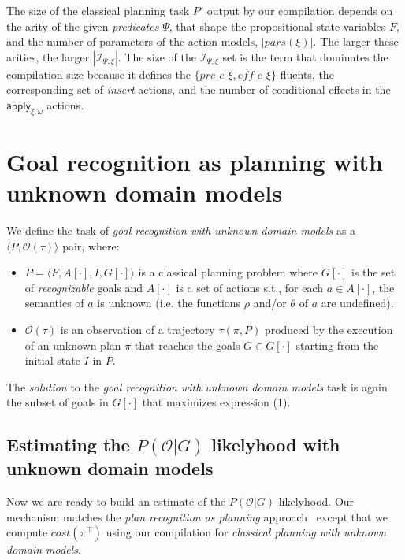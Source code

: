 \documentclass{article}
\newcommand{\tup}[1]{{\langle #1 \rangle}}
\begin{document}
The size of the classical planning task $P'$ output by our compilation depends on the arity of the given {\em predicates} $\Psi$, that shape the propositional state variables $F$, and the number of parameters of the action models, $|pars(\xi)|$. The larger these arities, the larger $|{\mathcal I}_{\Psi,\xi}|$. The size of the ${\mathcal I}_{\Psi,\xi}$ set is the term that dominates the compilation size because it defines the $\{pre\_e\_\xi, eff\_e\_\xi\}$ fluents, the corresponding set of {\em insert} actions, and the number of conditional effects in the $\mathsf{apply_{\xi,\omega}}$ actions. 



\section{Goal recognition as planning with unknown domain models}
\label{sec:recognition}

We define the task of {\em goal recognition with unknown domain models} as a $\tup{P,\mathcal{O}(\tau)}$ pair, where:
\begin{itemize}
\item $P=\tup{F,A[\cdot],I,G[\cdot]}$ is a classical planning problem where $G[\cdot]$ is the set of {\em recognizable} goals and $A[\cdot]$ is a set of actions s.t., for each $a\in A[\cdot]$, the semantics of $a$ is unknown (i.e. the functions $\rho$ and/or $\theta$ of $a$ are undefined).
\item $\mathcal{O}(\tau)$ is an observation of a trajectory $\tau(\pi,P)$ produced by the execution of an unknown plan $\pi$ that reaches the goals $G\in G[\cdot]$ starting from the initial state $I$ in $P$.
\end{itemize}

The {\em solution} to the {\em goal recognition with unknown domain models} task is again the subset of goals in $G[\cdot]$ that maximizes expression (1). 

\subsection{Estimating the $P(\mathcal{O}|G)$ likelyhood with unknown domain models}
Now we are ready to build an estimate of the $P(\mathcal{O}|G)$ likelyhood. Our mechanism matches the {\em plan recognition as planning} approach~\cite{ramirez2012plan} except that we compute $cost(\pi^\top)$ using our compilation for {\em classical planning with unknown domain models}.
\end{document}

